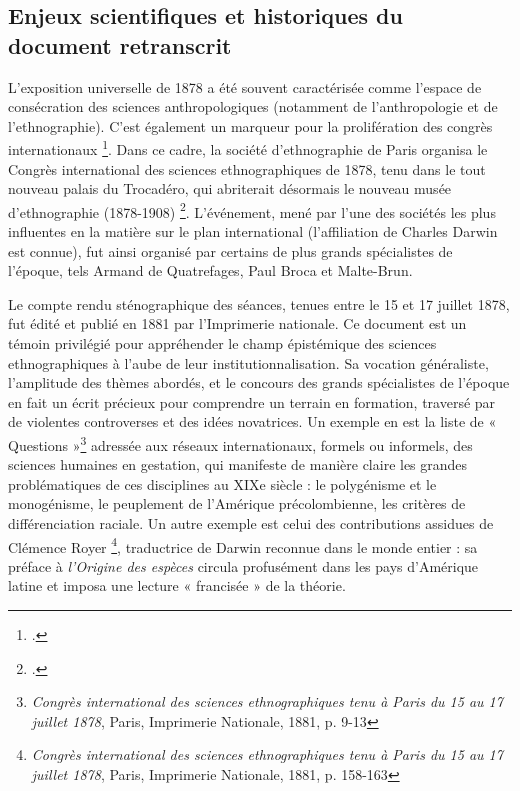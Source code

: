 \documentclass{article}
\begin{document}
	
	\subsection{Enjeux scientifiques et historiques du document retranscrit}
	
	L’exposition universelle de 1878 a été souvent caractérisée comme l’espace de consécration des sciences anthropologiques (notamment de l’anthropologie et de l’ethnographie). C’est également un marqueur pour la prolifération des congrès internationaux \footcite{rasmussenCongresInternationauxLies1989}. Dans ce cadre, la société d’ethnographie de Paris organisa le Congrès international des sciences ethnographiques de 1878, tenu dans le tout nouveau palais du Trocadéro, qui abriterait désormais le nouveau musée d’ethnographie (1878-1908) \footcite{legoffOrigineMuseeTrocadero2010}. L’événement, mené par l’une des sociétés les plus influentes en la matière sur le plan international (l’affiliation de Charles Darwin est connue), fut ainsi organisé par certains de plus grands spécialistes de l’époque, tels Armand de Quatrefages, Paul Broca et Malte-Brun. 
	
	Le compte rendu sténographique des séances, tenues entre le 15 et 17 juillet 1878, fut édité et publié en 1881 par l’Imprimerie nationale. Ce document est un témoin privilégié pour appréhender le champ épistémique des sciences ethnographiques à l’aube de leur institutionnalisation. Sa vocation généraliste, l’amplitude des thèmes abordés, et le concours des grands spécialistes de l’époque en fait un écrit précieux pour comprendre un terrain en formation, traversé par de violentes controverses et des idées novatrices. Un exemple en est la liste de « Questions »\footnote{\textit{Congrès international des sciences ethnographiques tenu à Paris du 15 au 17 juillet 1878}, Paris, Imprimerie Nationale, 1881, p. 9-13} adressée aux réseaux internationaux, formels ou informels, des sciences humaines en gestation, qui manifeste de manière claire les grandes problématiques de ces disciplines au XIXe siècle : le polygénisme et le monogénisme, le peuplement de l’Amérique précolombienne, les critères de différenciation raciale. Un autre exemple est celui des contributions assidues de Clémence Royer \footnote{\textit{Congrès international des sciences ethnographiques tenu à Paris du 15 au 17 juillet 1878}, Paris, Imprimerie Nationale, 1881, p. 158-163}, traductrice de Darwin reconnue dans le monde entier : sa préface à \textit{l’Origine des espèces} circula profusément dans les pays d’Amérique latine et imposa une lecture « francisée » de la théorie. 
	
\end{document}
